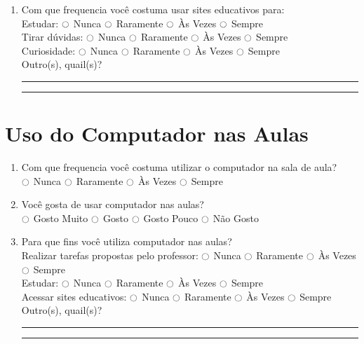 \begin{enumerate}
\item Com que frequencia você costuma usar sites educativos para: \\
Estudar: $\ocircle$ Nunca  $\ocircle$ Raramente  $\ocircle$ Às Vezes  $\ocircle$ Sempre \\
Tirar dúvidas: $\ocircle$ Nunca  $\ocircle$ Raramente  $\ocircle$ Às Vezes  $\ocircle$ Sempre \\
Curiosidade: $\ocircle$ Nunca  $\ocircle$ Raramente  $\ocircle$ Às Vezes  $\ocircle$ Sempre \\
Outro(s), quail(s)? \\
\noindent\rule{\textwidth}{0.4pt}
\noindent\rule{\textwidth}{0.4pt}

\end{enumerate}

\section{Uso do Computador nas Aulas}

\begin{enumerate}
\item Com que frequencia você costuma utilizar o computador na sala de aula? \\
$\ocircle$ Nunca  $\ocircle$ Raramente  $\ocircle$ Às Vezes  $\ocircle$ Sempre \\

\item Você gosta de usar computador nas aulas? \\
$\ocircle$ Gosto Muito $\ocircle$ Gosto $\ocircle$ Gosto Pouco $\ocircle$ Não Gosto

\item Para que fins você utiliza computador nas aulas? \\
Realizar tarefas propostas pelo professor: $\ocircle$ Nunca  $\ocircle$ Raramente  $\ocircle$ Às Vezes  $\ocircle$ Sempre \\
Estudar: $\ocircle$ Nunca  $\ocircle$ Raramente  $\ocircle$ Às Vezes  $\ocircle$ Sempre \\
Acessar sites educativos: $\ocircle$ Nunca  $\ocircle$ Raramente  $\ocircle$ Às Vezes  $\ocircle$ Sempre \\
Outro(s), quail(s)? \\
\noindent\rule{\textwidth}{0.4pt}
\noindent\rule{\textwidth}{0.4pt}

\end{enumerate}


